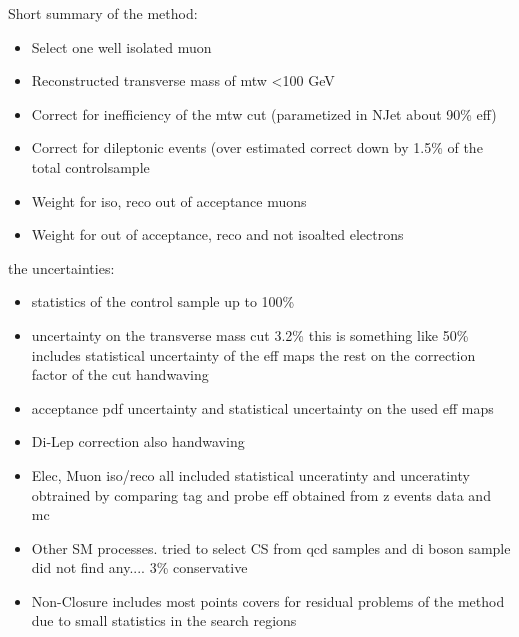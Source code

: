 



Short summary of the method:

\begin{itemize}
 \item Select one well isolated muon
 \item Reconstructed transverse mass of mtw <100 GeV
 \item Correct for inefficiency of the mtw cut (parametized in NJet about 90\% eff)
 \item Correct for dileptonic events (over estimated correct down by 1.5\% of the total controlsample
 \item Weight for iso, reco out of acceptance muons
 \item Weight for out of acceptance, reco and not isoalted electrons
\end{itemize}
the uncertainties:

\begin{itemize}
 \item statistics of the control sample up to 100\%
 \item uncertainty on the transverse mass cut 3.2\% this is something like 50\% includes statistical uncertainty of the eff maps the rest on the correction factor of the cut handwaving 
 \item acceptance pdf uncertainty and statistical uncertainty on the used eff maps
 \item Di-Lep correction also handwaving
 \item Elec, Muon iso/reco all included statistical unceratinty and unceratinty obtrained by comparing tag and probe eff obtained from z events data and mc
 \item Other SM processes. tried to select CS from qcd samples and di boson sample did not find any.... 3\% conservative
 \item Non-Closure includes most points covers for residual problems of the method due to small statistics in the search regions
\end{itemize}













